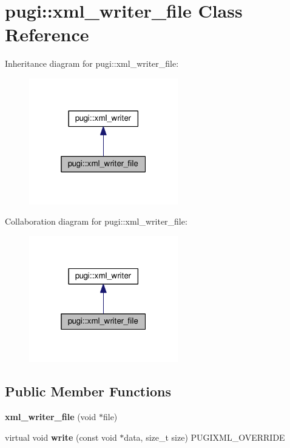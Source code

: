 \hypertarget{classpugi_1_1xml__writer__file}{\section{pugi\+:\+:xml\+\_\+writer\+\_\+file Class Reference}
\label{classpugi_1_1xml__writer__file}
}


Inheritance diagram for pugi\+:\+:xml\+\_\+writer\+\_\+file\+:
\nopagebreak
\begin{figure}[H]
\begin{center}
\leavevmode
\includegraphics[width=184pt]{classpugi_1_1xml__writer__file__inherit__graph}
\end{center}
\end{figure}


Collaboration diagram for pugi\+:\+:xml\+\_\+writer\+\_\+file\+:
\nopagebreak
\begin{figure}[H]
\begin{center}
\leavevmode
\includegraphics[width=184pt]{classpugi_1_1xml__writer__file__coll__graph}
\end{center}
\end{figure}
\subsection*{Public Member Functions}
\begin{DoxyCompactItemize}
\item 
\hypertarget{classpugi_1_1xml__writer__file_a458afaf5231f88e182fa16b13fc2b0a6}{{\bfseries xml\+\_\+writer\+\_\+file} (void $\ast$file)}\label{classpugi_1_1xml__writer__file_a458afaf5231f88e182fa16b13fc2b0a6}

\item 
\hypertarget{classpugi_1_1xml__writer__file_af89c557be2a43f11836f1f4db50855e6}{virtual void {\bfseries write} (const void $\ast$data, size\+\_\+t size) P\+U\+G\+I\+X\+M\+L\+\_\+\+O\+V\+E\+R\+R\+I\+D\+E}\label{classpugi_1_1xml__writer__file_af89c557be2a43f11836f1f4db50855e6}

\end{DoxyCompactItemize}



